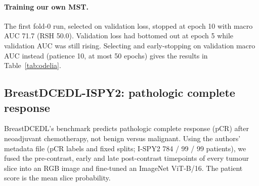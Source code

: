 \documentclass[11pt]{article}
\begin{document}
\paragraph{Training our own MST.} The first fold-0 run, selected on validation
loss, stopped at epoch 10 with macro AUC 71.7 (RSH 50.0). Validation loss had
bottomed out at epoch 5 while validation AUC was still rising. Selecting and
early-stopping on validation macro AUC instead (patience 10, at most 50
epochs) gives the results in Table~\ref{tab:odelia}.

\begin{table}[htbp]
  \centering
  \caption{ODELIA, our MST trained per fold with validation-AUC selection. AUC $\times100$; std across folds (the paper's $\pm$ is a bootstrap std of the pooled estimate).}
  \label{tab:odelia}
\end{table}

\subsection{BreastDCEDL-ISPY2: pathologic complete response}

BreastDCEDL's benchmark predicts pathologic complete response (pCR) after
neoadjuvant chemotherapy, not benign versus malignant. Using the authors'
metadata file (pCR labels and fixed splits; I-SPY2 784 / 99 / 99 patients),
we fused the pre-contrast, early and late post-contrast timepoints of every
tumour slice into an RGB image and fine-tuned an ImageNet ViT-B/16. The
patient score is the mean slice probability.
\end{document}
